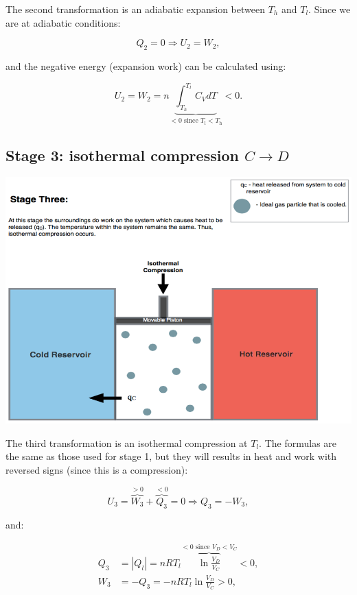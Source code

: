 \documentclass[
]{book}
\theoremstyle{definition}
\theoremstyle{definition}
\theoremstyle{definition}
\theoremstyle{remark}
\begin{document}
The second transformation is an adiabatic expansion between \(T_h\) and \(T_l\). Since we are at adiabatic conditions:

\begin{equation}
Q_2 = 0 \Rightarrow U_2 = W_2,
  \label{eq:CCst2}
\end{equation}

and the negative energy (expansion work) can be calculated using:

\begin{equation}
U_2 = W_2 = n \underbrace{\int_{T_h}^{T_l} C_V dT}_{<0 \text{ since } T_\mathrm{l}<T_\mathrm{h}} < 0.
  \label{eq:CCst2b}
\end{equation}

\hypertarget{CCstage3}{%
\subsection{\texorpdfstring{Stage 3: isothermal compression \(C \rightarrow D\)}{Stage 3: isothermal compression C \textbackslash rightarrow D}}\label{CCstage3}}

\begin{center}\includegraphics[width=0.7\linewidth]{./img/OEP_Figures.007c} \end{center}

The third transformation is an isothermal compression at \(T_l\). The formulas are the same as those used for stage 1, but they will results in heat and work with reversed signs (since this is a compression):

\begin{equation}
U_3 = \overbrace{W_3}^{>0} + \overbrace{Q_3}^{<0} = 0 \Rightarrow Q_3 = -W_3,
  \label{eq:CCst3}
\end{equation}

and:

\begin{equation}
\begin{aligned}
 Q_3 & = \left| Q_l \right|  = nRT_l \overbrace{\ln \frac{V_D}{V_C}}^{<0 \text{ since } V_D<V_C} < 0 , \\
 W_3 & = -Q_3 = - nRT_l \ln \frac{V_D}{V_C} > 0,
\end{aligned}
  \label{eq:CCst3b}
\end{equation}
\end{document}
